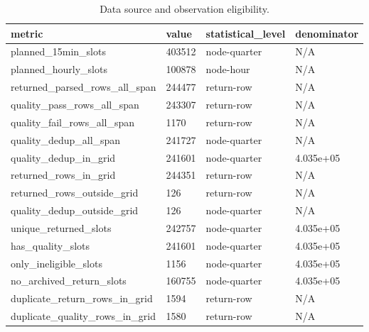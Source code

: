 \begin{table}[!htbp]
\centering
\caption{Data source and observation eligibility.}
\begin{tabular}{llll}
\hline
metric & value & statistical\_level & denominator \\ 
\hline
planned\_15min\_slots & 403512 & node-quarter & N/A \\
planned\_hourly\_slots & 100878 & node-hour & N/A \\
returned\_parsed\_rows\_all\_span & 244477 & return-row & N/A \\
quality\_pass\_rows\_all\_span & 243307 & return-row & N/A \\
quality\_fail\_rows\_all\_span & 1170 & return-row & N/A \\
quality\_dedup\_all\_span & 241727 & node-quarter & N/A \\
quality\_dedup\_in\_grid & 241601 & node-quarter & 4.035e+05 \\
returned\_rows\_in\_grid & 244351 & return-row & N/A \\
returned\_rows\_outside\_grid & 126 & return-row & N/A \\
quality\_dedup\_outside\_grid & 126 & node-quarter & N/A \\
unique\_returned\_slots & 242757 & node-quarter & 4.035e+05 \\
has\_quality\_slots & 241601 & node-quarter & 4.035e+05 \\
only\_ineligible\_slots & 1156 & node-quarter & 4.035e+05 \\
no\_archived\_return\_slots & 160755 & node-quarter & 4.035e+05 \\
duplicate\_return\_rows\_in\_grid & 1594 & return-row & N/A \\
duplicate\_quality\_rows\_in\_grid & 1580 & return-row & N/A \\
\hline
\end{tabular}
\end{table}

